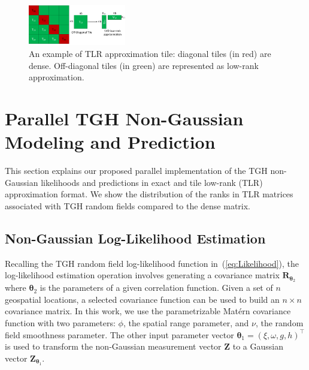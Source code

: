 \documentclass[conference]{IEEEtran}
\begin{document}
\begin{figure}[h]
\centering
\includegraphics[width=0.38\textwidth]{./figures/tlr_graph.pdf}
\caption{An example of TLR approximation tile: diagonal tiles (in red) are dense. Off-diagonal tiles (in green) are represented as
low-rank approximation.}
\label{fig:tlr-structure}
\end{figure}

\section{Parallel TGH Non-Gaussian Modeling and Prediction}

This section explains our proposed parallel
implementation of the TGH non-Gaussian likelihoods
and predictions in exact and tile low-rank (TLR) approximation
format. We show the
distribution of the ranks in TLR matrices
associated with TGH random fields compared to the dense matrix.



\subsection{Non-Gaussian Log-Likelihood Estimation}
Recalling the TGH random field log-likelihood function
in~(\ref{eq:Likelihood}), the log-likelihood estimation
operation involves generating a covariance 
matrix $\bm{R}_{\bm{\theta}_2}$ where $\bm{\theta}_2$ is the parameters of 
a given correlation function. Given a set of $n$ geospatial
locations, a selected covariance function can be used to
build an $n \times n$ covariance matrix. In this work, we
use the parametrizable Mat\'ern covariance function with
two parameters: $\phi$, the spatial range parameter, 
and $\nu$, the random field smoothness parameter.  
The other input parameter vector $\bm{\theta}_1= (\xi, \omega, g, h)^\top$ 
is used to transform the non-Gaussian measurement 
vector $\bm{Z}$  to a Gaussian vector $\bm{Z}_{\bm{\theta}_1}$. 
\end{document}

